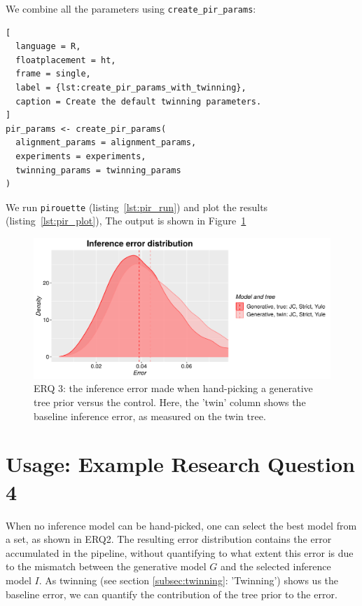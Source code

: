 We combine all the parameters using \verb;create_pir_params;:

\begin{lstlisting}[
  language = R,
  floatplacement = ht,
  frame = single,
  label = {lst:create_pir_params_with_twinning},
  caption = Create the default twinning parameters.
]
pir_params <- create_pir_params(
  alignment_params = alignment_params,
  experiments = experiments,
  twinning_params = twinning_params
)
\end{lstlisting}

We run \verb;pirouette; (listing~\ref{lst:pir_run}) 
and plot the results (listing~\ref{lst:pir_plot}),
The output is shown in Figure~\ref{fig:example_3}

\begin{figure}[H]
  \includegraphics[width=\textwidth]{example_3/errors.png}
  \caption{
    ERQ 3: the inference error made 
    when hand-picking a generative tree prior versus the control.
    Here, the 'twin' column shows the baseline inference error,
    as measured on the twin tree.
  }
  \label{fig:example_3}
\end{figure}

\section{Usage: Example Research Question 4}

When no inference model can be hand-picked, 
one can select the best model from a set,
as shown in ERQ2.
The resulting error distribution contains the error accumulated in the pipeline,
without quantifying to what extent this error is due to the mismatch between 
the generative model $\mathit{G}$ and the selected inference model 
$\mathit{I}$.
As twinning (see section \ref{subsec:twinning}: 'Twinning') shows us the baseline error, we can quantify the contribution of the tree prior to the error.


